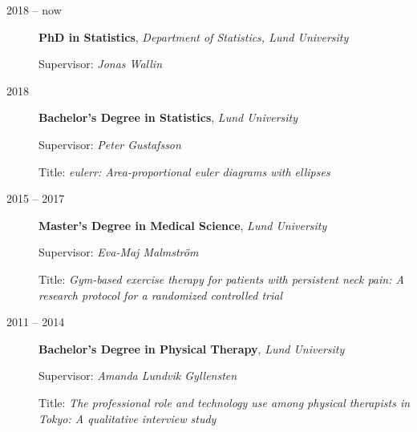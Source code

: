 \documentclass[
  10pt,
  headsepline=true,
  english,
  DIV=12
]{scrartcl}
\renewcommand*{%
  \mkbibnamegiven
}[1]{\ifitemannotation{highlight}{\textbf{#1}}{#1}}
\renewcommand*{%
  \mkbibnamefamily
}[1]{\ifitemannotation{highlight}{\textbf{#1}}{#1}}
\begin{document}
\begin{description}
  \item[2018 -- now] {
        \textbf{PhD in Statistics}, \emph{Department of Statistics, Lund
          University}

        Supervisor: \emph{Jonas Wallin}
        }

  \item[2018] {
        \textbf{Bachelor's Degree in Statistics}, \emph{Lund University}

        Supervisor: \emph{Peter Gustafsson}

        Title: \emph{eulerr: Area-proportional euler diagrams with ellipses}
        }

  \item[2015 -- 2017] {
        \textbf{Master's Degree in Medical Science}, \emph{Lund University}

        Supervisor: \emph{Eva-Maj Malmström}

        Title: \emph{Gym-based exercise therapy for patients with persistent
          neck pain: A research protocol for a randomized controlled trial}
        }

  \item[2011 -- 2014] {
        \textbf{Bachelor's Degree in Physical Therapy}, \emph{Lund University}

        Supervisor: \emph{Amanda Lundvik Gyllensten}

        Title: \emph{The professional role and technology use among physical
          therapists in Tokyo: A qualitative interview study}
        }
\end{description}





\end{document}
